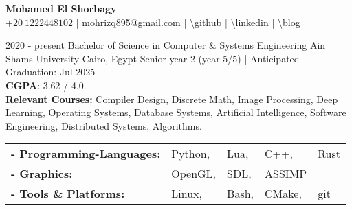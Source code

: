 \documentclass[hidelinks]{report}
\begin{document}
\begin{center}
    \noindent \Huge{ \selectfont \bfseries Mohamed El Shorbagy}\\[.4em]
    \large
    $+20 \ 1222448102$           |
    mohrizq895@gmail.com         | 
    \underline{\url{\github}}    |
    \underline{\url{\linkedin}}  |
    \underline{\url{\blog}}  
\end{center}


\vspace{2mm}

\large
{}

\entry
    {2020 - present} 
    {Bachelor of Science in Computer \& Systems Engineering }
    {Ain Shams University}
    {Cairo, Egypt  }
    {\textbullet Senior year 2 (year 5/5) | Anticipated Graduation: Jul 2025 \\ 
     \textbullet \textbf{CGPA}: 3.62 / 4.0. \\  
     \textbullet \textbf{Relevant Courses:} Compiler Design, Discrete Math, Image Processing, Deep Learning,
     Operating Systems, Database Systems, Artificial Intelligence, Software Engineering, Distributed Systems, 
     Algorithms. 
    }  


\vspace{2mm}



\begin{tabular}{ l l l l l}
      \bf{- Programming-Languages:} & Python, & Lua, & C++, & Rust\\ 
      \bf{- Graphics:} & OpenGL,&  SDL, & ASSIMP \\ 
      \bf{- Tools \& Platforms:} & Linux, & Bash, & CMake, & git \\ 
       
\end{tabular}

\vspace{4mm}

\end{document}
